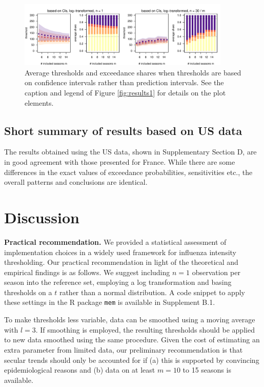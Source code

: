 \documentclass[12pt]{article}
\begin{document}
\begin{figure}[h!]
\begin{center}
\includegraphics[width=0.9\textwidth]{figure/plot_ci_fr.pdf}\vspace{-5mm}
\end{center}
\caption{Average thresholds and exceedance shares when thresholds are based on confidence intervals rather than prediction intervals. See the caption and legend of Figure \ref{fig:results1} for details on the plot elements.}
\label{fig:cis}
\end{figure}




\subsection{Short summary of results based on US data}
\label{subsec:results_us}

The results obtained using the US data, shown in Supplementary Section D, are in good agreement with those presented for France. While there are some differences in the exact values of exceedance probabilities, sensitivities etc., the overall patterns and conclusions are identical.

\section{Discussion}
\label{sec:discussion}

\textbf{Practical recommendation.} We provided a statistical assessment of implementation choices in a widely used framework for influenza intensity thresholding. Our practical recommendation in light of the theoretical and empirical findings is as follows. We suggest including $n = 1$ observation per season into the reference set, employing a log transformation and basing thresholds on a $t$ rather than a normal distribution. A code snippet to apply these settings in the R package \texttt{mem} is available in Supplement B.1.

To make thresholds less variable, data can be smoothed using a moving average with $l = 3$. If smoothing is employed, the resulting thresholds should be applied to new data smoothed using the same procedure. Given the cost of estimating an extra parameter from limited data, our preliminary recommendation is that secular trends should only be accounted for if (a) this is supported by convincing epidemiological reasons and (b) data on at least $m = 10$ to 15 seasons is available.
\end{document}
